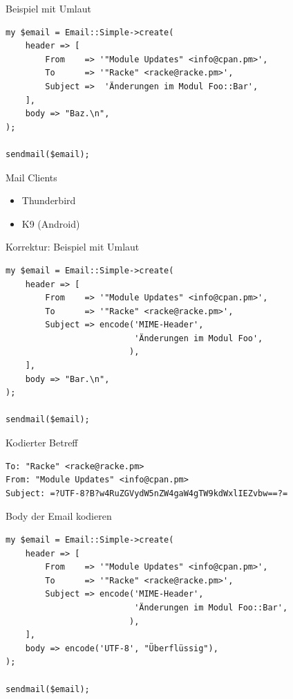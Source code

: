 \begin{frame}[fragile]{Beispiel mit Umlaut}
  \begin{verbatim}
my $email = Email::Simple->create(
    header => [
        From    => '"Module Updates" <info@cpan.pm>',
        To      => '"Racke" <racke@racke.pm>',
        Subject =>  'Änderungen im Modul Foo::Bar',
    ],
    body => "Baz.\n",
);

sendmail($email);
  \end{verbatim}
\end{frame}

\begin{frame}[fragile]{Mail Clients}

  \begin{itemize}
  \item[\goodsmile] Thunderbird
  \item[\sadsmile] K9 (Android)
  \end{itemize}

\end{frame}

\begin{frame}[fragile]{Korrektur: Beispiel mit Umlaut}
  \begin{verbatim}
my $email = Email::Simple->create(
    header => [
        From    => '"Module Updates" <info@cpan.pm>',
        To      => '"Racke" <racke@racke.pm>',
        Subject => encode('MIME-Header', 
                          'Änderungen im Modul Foo',
                         ),
    ],
    body => "Bar.\n",
);

sendmail($email);
  \end{verbatim}
\end{frame}

\begin{frame}[fragile]{Kodierter Betreff}
  \begin{lstlisting}
To: "Racke" <racke@racke.pm>
From: "Module Updates" <info@cpan.pm>
Subject: =?UTF-8?B?w4RuZGVydW5nZW4gaW4gTW9kdWxlIEZvbw==?=
\end{lstlisting}
\end{frame}

\begin{frame}[fragile]{Body der Email kodieren}
  \begin{verbatim}
my $email = Email::Simple->create(
    header => [
        From    => '"Module Updates" <info@cpan.pm>',
        To      => '"Racke" <racke@racke.pm>',
        Subject => encode('MIME-Header',
                          'Änderungen im Modul Foo::Bar',
                         ),
    ],
    body => encode('UTF-8', "Überflüssig"),
);

sendmail($email);
  \end{verbatim}
\end{frame}

